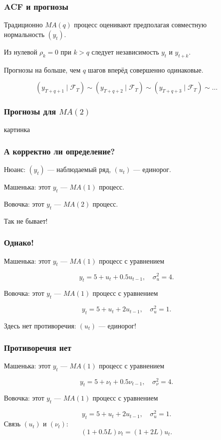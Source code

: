 \begin{frame}
  \frametitle{ACF и прогнозы}

  Традиционно $MA(q)$ процесс оценивают предполагая совместную нормальность $(y_t)$. 

  \pause
  Из нулевой $\rho_k=0$ при $k>q$ следует независимость $y_t$ и $y_{t+k}$.
  
  \pause
  Прогнозы на больше, чем $q$ шагов вперёд совершенно одинаковые. 

  \[
      (y_{T+q + 1} \mid \mathcal{F}_T) \sim (y_{T+q + 2} \mid \mathcal{F}_T) \sim (y_{T+q + 3} \mid \mathcal{F}_T) \sim \ldots 
  \]
\end{frame}

\begin{frame}
  \frametitle{Прогнозы для $MA(2)$}

  картинка
  

\end{frame}


\begin{frame}
  \frametitle{А корректно ли определение?}
  
  Нюанс: $(y_t)$ — наблюдаемый ряд, $(u_t)$ — \alert{единорог}.

  \pause

  Машенька: этот $y_t$ — $MA(1)$ процесс.

  Вовочка: этот $y_t$ — $MA(2)$ процесс. 

  \pause 

  Так \alert{не бывает!}

\end{frame}



\begin{frame}
  \frametitle{Однако!}

  Машенька: этот $y_t$ — $MA(1)$ процесс с уравнением

  \[
    y_t = 5 + u_t + 0.5 u_{t-1}, \quad \sigma^2_u = 4.
  \]

  Вовочка: этот $y_t$ — $MA(1)$ процесс с уравнением

  \[
    y_t = 5 + u_t + 2 u_{t-1}, \quad \sigma^2_u = 1.
  \]

  \pause
  Здесь \alert{нет противоречия}: $(u_t)$ — единорог!
\end{frame}

\begin{frame}
  \frametitle{Противоречия нет}

  Машенька: этот $y_t$ — $MA(1)$ процесс с уравнением

  \[
    y_t = 5 + \nu_t + 0.5 \nu_{t-1}, \quad \sigma^2_{\nu} = 4.
  \]

  Вовочка: этот $y_t$ — $MA(1)$ процесс с уравнением

  \[
    y_t = 5 + u_t + 2 u_{t-1}, \quad \sigma^2_u = 1.
  \]
  \pause
  Связь $(u_t)$ и $(\nu_t)$:
  \[
  (1+0.5L)\nu_t = (1+2L)u_t.  
  \]
\end{frame}



